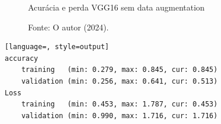 \begin{figure}[h!]
\centering
\caption{Acurácia e perda VGG16 sem data augmentation}
\hspace*{-2cm} %
\caption*{Fonte: O autor (2024).}
\end{figure}

\begin{lstlisting}[language=, style=output]
accuracy
	training   (min: 0.279, max: 0.845, cur: 0.845)
	validation (min: 0.256, max: 0.641, cur: 0.513)
Loss
	training   (min: 0.453, max: 1.787, cur: 0.453)
	validation (min: 0.990, max: 1.716, cur: 1.716)
\end{lstlisting}


